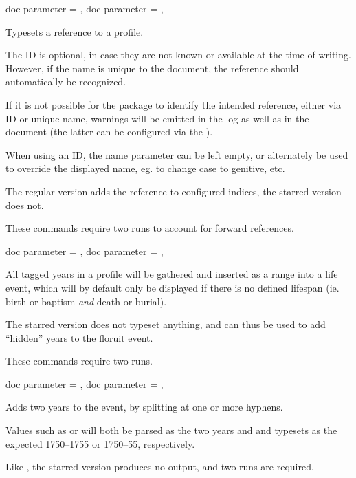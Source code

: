 \documentclass[
	a4paper,
]{article}
\begin{document}
\begin{docCommands}[
		doc name = {gprRef}
	]
	{
		{ doc parameter = {}},
		{ doc parameter = {\sarg{}}},
	}

	Typesets a reference to a profile.

	The ID is optional, in case they are not known or available at the time of writing. However, if the name is unique to the document, the reference should automatically be recognized.

	If it is not possible for the package to identify the intended reference, either via ID or unique name, warnings will be emitted in the log as well as in the document (the latter can be configured via the ).

	When using an ID, the name parameter can be left empty, or alternately be used to override the displayed name, eg. to change case to genitive, etc.

	The regular version adds the reference to configured indices, the starred version does not.

	These commands require two runs to account for forward references.
\end{docCommands}


\begin{docCommands}[
		doc name = {gprYear}
	]
	{
		{ doc parameter = {}},
		{ doc parameter = {\sarg{}}},
	}

	All tagged years in a profile will be gathered and inserted as a range into a  life event, which will by default only be displayed if there is no defined lifespan (ie. birth or baptism \emph{and} death or burial).
	
	The starred version does not typeset anything, and can thus be used to add \enquote{hidden} years to the floruit event.

	These commands require two runs.
\end{docCommands}


\begin{docCommands}[
		doc name = {gprYears}
	]
	{
		{ doc parameter = {}},
		{ doc parameter = {\sarg{}}},
	}

	Adds two years to the  event, by splitting at one or more hyphens.

	Values such as  or  will both be parsed as the two years  and  and typesets as the expected 1750--1755 or 1750--55, respectively.

	Like , the starred version produces no output, and two runs are required.
\end{docCommands}
\end{document}
